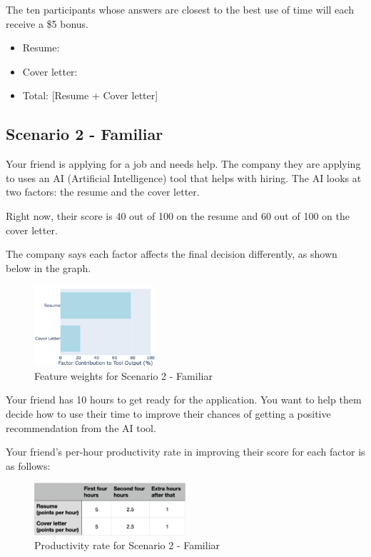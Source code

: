 The ten participants whose answers are closest to the best use of time will each receive a \$5 bonus.

\begin{itemize}
    \item Resume: \underline{\hspace{3cm}}
    \item Cover letter: \underline{\hspace{3cm}}
    \item Total: [Resume + Cover letter]
\end{itemize}


\subsection{Scenario 2 - Familiar}
Your friend is applying for a job and needs help. The company they are applying to uses an AI (Artificial Intelligence) tool that helps with hiring. The AI looks at two factors: the resume and the cover letter.

Right now, their score is 40 out of 100 on the resume and 60 out of 100 on the cover letter.

The company says each factor affects the final decision differently, as shown below in the graph.
\begin{figure}[ht]
    \centering
    \includegraphics[width=0.4\textwidth]{Figures/2-unequal.png}
    \caption{Feature weights for Scenario 2 - Familiar}
    \label{fig:survey-weights-scenario2}
\end{figure}

Your friend has 10 hours to get ready for the application. You want to help them decide how to use their time to improve their chances of getting a positive recommendation from the AI tool.

Your friend’s per-hour productivity rate in improving their score for each factor is as follows:
\begin{figure}[ht]
    \centering
    \includegraphics[width=0.5\textwidth]{Figures/cost-two.png}
    \caption{Productivity rate for Scenario 2 - Familiar}
    \label{fig:survey-cost-scenario2}
\end{figure}

